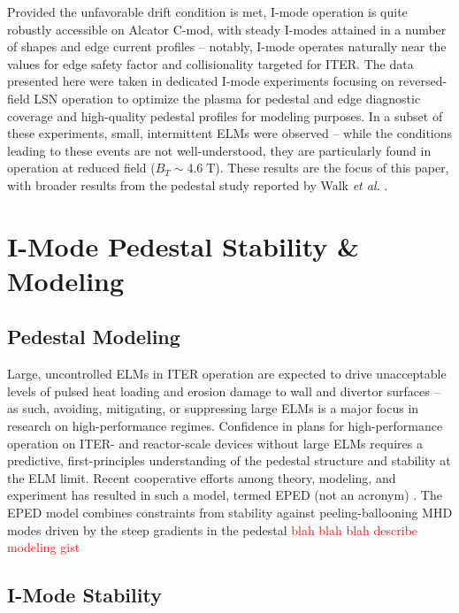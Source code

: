\documentclass[12pt,floatfix,showpacs]{revtex4-1}
\newcommand{\note}[1]{\textcolor{red}{#1}}
\newcommand{\gnote}[1]{\marginpar{\textcolor{red}{\scriptsize{#1}}}}
\begin{document}
Provided the unfavorable drift condition is met, I-mode operation is quite robustly accessible on Alcator C-mod, with steady I-modes attained in a number of shapes and edge current profiles -- notably, I-mode operates naturally near the values for edge safety factor and collisionality targeted for ITER.  
The data presented here were taken in dedicated I-mode experiments focusing on reversed-field LSN operation to optimize the plasma for pedestal and edge diagnostic coverage and high-quality pedestal profiles for modeling purposes.  
In a subset of these experiments, small, intermittent ELMs were observed -- while the conditions leading to these events are not well-understood, they are particularly found in operation at reduced field ($B_T \sim 4.6 \;\mbox{T}$).  
These results are the focus of this paper, with broader results from the pedestal study reported by Walk \emph{et al.} \cite{Walk2014}.\gnote{get formatting right}

\section{I-Mode Pedestal Stability \& Modeling}\label{sec:model}

\subsection{Pedestal Modeling}\label{subsec:ped_mod}

Large, uncontrolled ELMs in ITER operation are expected to drive unacceptable levels of pulsed heat loading and erosion damage to wall and divertor surfaces \cite{Loarte2003,Federici2003} -- as such, avoiding, mitigating, or suppressing large ELMs is a major focus in research on high-performance regimes.  
Confidence in plans for high-performance operation on ITER- and reactor-scale devices without large ELMs requires a predictive, first-principles understanding of the pedestal structure and stability at the ELM limit.  
Recent cooperative efforts among theory, modeling, and experiment \cite{Groebner2013} has resulted in such a model, termed EPED (not an acronym) \cite{Snyder2009,Snyder2011}.  
The EPED model combines constraints from stability against peeling-ballooning MHD modes driven by the steep gradients in the pedestal \note {blah blah blah describe modeling gist}

\subsection{I-Mode Stability}\label{subsec:imode_mod}
\end{document}
